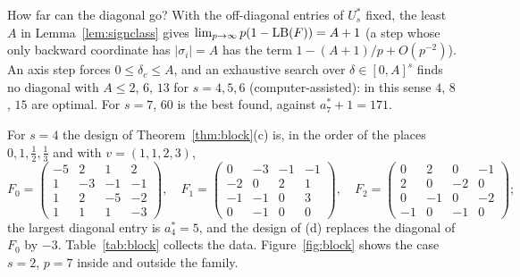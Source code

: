 How far can the diagonal go? With the off-diagonal entries of $U^*_s$ fixed, the least $A$ in Lemma~\ref{lem:signclass} gives $\lim_{p\to\infty}p(1-\mathrm{LB}(F))=A+1$ (a step whose only backward coordinate has $|\sigma_i|=A$ has the term $1-(A+1)/p+O(p^{-2})$). An axis step forces $0\le\delta_c\le A$, and an exhaustive search over $\delta\in[0,A]^s$ finds no diagonal with $A\le2$, $6$, $13$ for $s=4,5,6$ (computer-assisted): in this sense $4$, $8$, $15$ are optimal. For $s=7$, $60$ is the best found, against $a^*_7+1=171$.

For $s=4$ the design of Theorem~\ref{thm:block}(c) is, in the order of the places $0,1,\frac12,\frac13$ and with $v=(1,1,2,3)$,
\[
F_0=\begin{pmatrix}-5&2&1&2\\1&-3&-1&-1\\1&2&-5&-2\\1&1&1&-3\end{pmatrix},\quad
F_1=\begin{pmatrix}0&-3&-1&-1\\-2&0&2&1\\-1&-1&0&3\\0&-1&0&0\end{pmatrix},\quad
F_2=\begin{pmatrix}0&2&0&-1\\2&0&-2&0\\0&-1&0&-2\\-1&0&-1&0\end{pmatrix};
\]
the largest diagonal entry is $a^*_4=5$, and the design of (d) replaces the diagonal of $F_0$ by $-3$. Table~\ref{tab:block} collects the data. Figure~\ref{fig:block} shows the case $s=2$, $p=7$ inside and outside the family.

